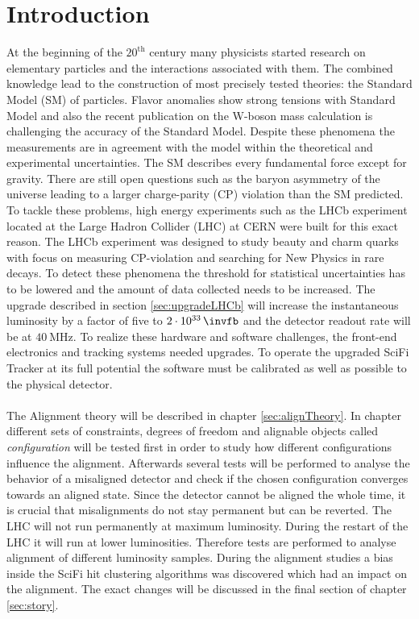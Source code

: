 \chapter{Introduction}
\label{sec:einleitung}

At the beginning of the $20^{\text{th}}$ century many physicists started research on
elementary particles and the interactions associated with them. The combined
knowledge lead to the construction of most precisely tested theories: the
Standard Model (SM) of particles.
Flavor anomalies show strong tensions with Standard Model and also the recent publication on the W-boson mass calculation is challenging the accuracy of the Standard Model. Despite these phenomena the measurements are in agreement
with the model within the theoretical and experimental uncertainties.
The SM describes every fundamental force except for gravity. There are still open
questions such as the baryon asymmetry of the universe leading to a larger
charge-parity (CP) violation than the SM predicted.
To tackle these problems, high energy experiments such as the LHCb experiment located at the Large Hadron Collider (LHC) at CERN were built for this exact reason.
The LHCb experiment was designed to study beauty and charm quarks with focus on measuring CP-violation and searching for New Physics in rare decays.
To detect these phenomena the threshold for statistical uncertainties has to
be lowered and the amount of data collected needs to be increased. The upgrade
described in section \ref{sec:upgradeLHCb} will increase the instantaneous
luminosity by a factor of five to $\SI{2e33}{\invfb}$ and
the detector readout rate will be at $\SI{40}{\mega\hertz}$. To realize these
hardware and software challenges, the front-end electronics and tracking systems needed upgrades.
To operate the upgraded SciFi Tracker at its full potential the software must be
calibrated as well as possible to the physical detector.
\\
\\
The Alignment theory will be described in chapter \ref{sec:alignTheory}.
In chapter \label{sec:story} different sets of constraints, degrees of freedom
and alignable objects called \textit{configuration} will be tested first in order
to study how different configurations influence the alignment. Afterwards several
tests will be performed to analyse the behavior of a misaligned detector and check
if the chosen configuration converges towards an aligned state. Since the detector
cannot be aligned the whole time, it is crucial that misalignments do not stay
permanent but can be reverted.
The LHC will not run permanently at maximum luminosity. During the restart of the LHC it will run at lower luminosities. Therefore tests are performed to analyse alignment of different luminosity samples. During the alignment studies a bias inside the SciFi hit clustering algorithms was discovered which had an impact on the alignment. The exact changes will be discussed in the final section of chapter \ref{sec:story}.
